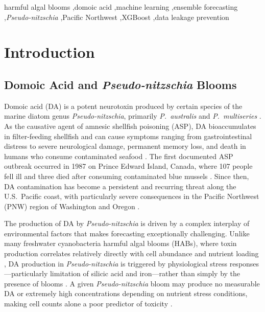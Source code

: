 \documentclass[preprint,12pt,authoryear]{elsarticle}
\begin{document}
\begin{frontmatter}
\begin{keyword}
harmful algal blooms \sep domoic acid \sep machine learning \sep ensemble forecasting \sep \textit{Pseudo-nitzschia} \sep Pacific Northwest \sep XGBoost \sep data leakage prevention
\end{keyword}

\end{frontmatter}

\linenumbers

\section{Introduction}
\label{sec:introduction}

\subsection{Domoic Acid and \textit{Pseudo-nitzschia} Blooms}
\label{sec:intro-biology}

Domoic acid (DA) is a potent neurotoxin produced by certain species of the marine diatom genus \textit{Pseudo-nitzschia}, primarily \textit{P.\ australis} and \textit{P.\ multiseries} \citep{Bates2018, Trainer2012}. As the causative agent of amnesic shellfish poisoning (ASP), DA bioaccumulates in filter-feeding shellfish and can cause symptoms ranging from gastrointestinal distress to severe neurological damage, permanent memory loss, and death in humans who consume contaminated seafood \citep{Lefebvre2010, Wright1989}. The first documented ASP outbreak occurred in 1987 on Prince Edward Island, Canada, where 107 people fell ill and three died after consuming contaminated blue mussels \citep{Wright1989, Bates1998}. Since then, DA contamination has become a persistent and recurring threat along the U.S.\ Pacific coast, with particularly severe consequences in the Pacific Northwest (PNW) region of Washington and Oregon \citep{Lewitus2012, Horner1997, Trainer2012}.

The production of DA by \textit{Pseudo-nitzschia} is driven by a complex interplay of environmental factors that makes forecasting exceptionally challenging. Unlike many freshwater cyanobacteria harmful algal blooms (HABs), where toxin production correlates relatively directly with cell abundance and nutrient loading \citep{Paerl2013}, DA production in \textit{Pseudo-nitzschia} is triggered by physiological stress responses---particularly limitation of silicic acid and iron---rather than simply by the presence of blooms \citep{Trick2010, Marchetti2004, Lelong2012}. A given \textit{Pseudo-nitzschia} bloom may produce no measurable DA or extremely high concentrations depending on nutrient stress conditions, making cell counts alone a poor predictor of toxicity \citep{Bates2018, Trainer2012, Sauvey2023}.
\end{document}
